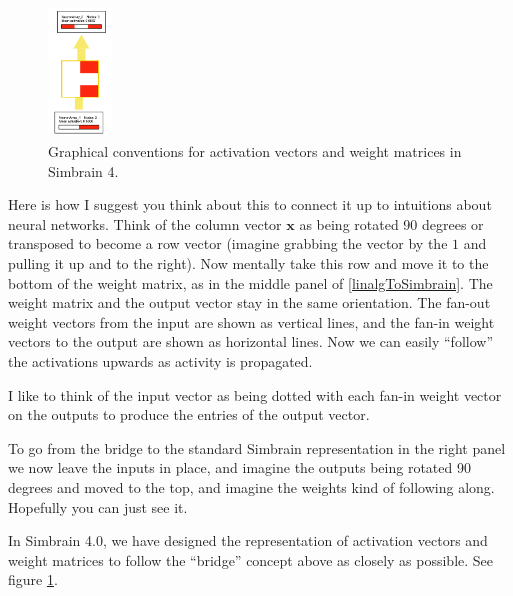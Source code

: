 \begin{figure}[h]
\centering
\includegraphics[width=0.15\textwidth]{images/simbrain4_ff_2_3.png}
\caption[Jeff Yoshimi.]{Graphical conventions for activation vectors and weight matrices in Simbrain 4. }
\label{simbrain4_ff23}
\end{figure}
Here is how I suggest you think about this to connect it up to intuitions about neural networks. Think of the column vector $\mathbf{x}$ as being rotated 90 degrees or transposed to become a row vector (imagine grabbing the vector by the $1$ and pulling it up and to the right). Now mentally take this row and move it to the bottom of the weight matrix, as in the middle panel of  \ref{linalgToSimbrain}. The weight matrix and the output vector stay in the same orientation. The fan-out weight vectors from the input are shown as vertical lines, and the fan-in weight vectors to the output are shown as horizontal lines. Now we can easily ``follow'' the activations upwards as activity is propagated. 

I like to think of the input vector as being dotted with each fan-in weight vector on the outputs to produce the entries of the output vector.

To go from the bridge to the standard Simbrain representation in the right panel we now leave the inputs in place, and imagine the outputs being rotated 90 degrees and moved to the top, and imagine the weights kind of following along. Hopefully you can just see it. 

In Simbrain 4.0, we have designed the representation of activation vectors and weight matrices to follow the ``bridge'' concept above as closely as possible. See figure \ref{simbrain4_ff23}.


%
%
%

